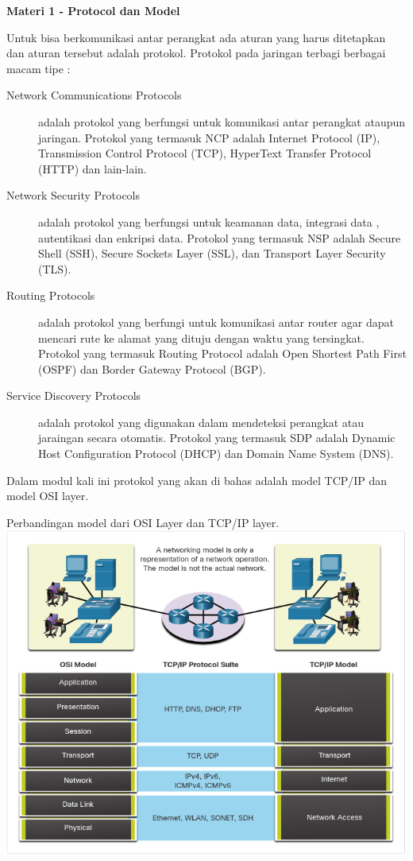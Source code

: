 \documentclass{article}
\begin{document}
    \begin{flushleft}
        \textbf{Materi 1 - Protocol dan Model}
        \newline

        Untuk bisa berkomunikasi antar perangkat ada aturan yang harus ditetapkan dan aturan tersebut adalah protokol. Protokol pada jaringan terbagi berbagai macam tipe :

        \begin{description}
            \item[Network Communications Protocols] adalah protokol yang berfungsi untuk komunikasi antar perangkat ataupun jaringan. 
            Protokol yang termasuk NCP adalah Internet Protocol (IP), Transmission Control Protocol (TCP), HyperText Transfer Protocol (HTTP) dan lain-lain.
            \item[Network Security Protocols] adalah protokol yang berfungsi untuk keamanan data, integrasi data , autentikasi dan enkripsi data. 
            Protokol yang termasuk NSP adalah Secure Shell (SSH), Secure Sockets Layer (SSL), dan Transport Layer Security (TLS).
            \item[Routing Protocols] adalah protokol yang berfungi untuk komunikasi antar router agar dapat mencari rute ke alamat yang dituju dengan waktu yang tersingkat. 
            Protokol yang termasuk Routing Protocol adalah Open Shortest Path First (OSPF) dan Border Gateway Protocol (BGP).
            \item[Service Discovery Protocols] adalah protokol yang digunakan dalam mendeteksi perangkat atau jaraingan secara otomatis.
            Protokol yang termasuk SDP adalah  Dynamic Host Configuration Protocol (DHCP) dan Domain Name System (DNS).
        \end{description}

        Dalam modul kali ini protokol yang akan di bahas adalah model TCP/IP dan model OSI layer.

        Perbandingan model dari OSI Layer dan TCP/IP layer.
        \includegraphics[scale=0.65]{osi-tcp-layer.png}


\end{flushleft}
\end{document}
